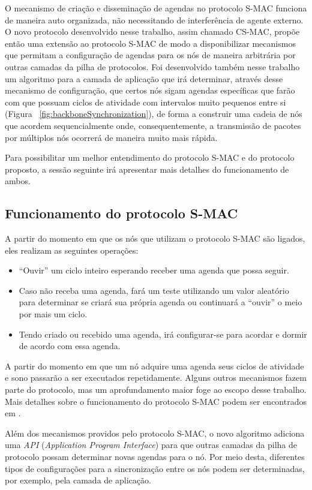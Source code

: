 O mecanismo de criação e disseminação de agendas no protocolo S-MAC funciona de maneira auto organizada, não necessitando de interferência de agente externo. O novo protocolo desenvolvido nesse trabalho, assim chamado CS-MAC, propõe então uma extensão ao protocolo S-MAC de modo a disponibilizar mecanismos que permitam a configuração de agendas para os nós de maneira arbitrária por outras camadas da pilha de protocolos. Foi desenvolvido também nesse trabalho um algoritmo para a camada de aplicação que irá determinar, através desse mecanismo de configuração,  que certos nós sigam agendas específicas que farão com que possuam ciclos de atividade com intervalos muito pequenos entre si (Figura ~\ref{fig:backboneSynchronization}), de forma a construir uma cadeia de nós que acordem sequencialmente onde, consequentemente, a transmissão de pacotes por múltiplos nós ocorrerá de maneira muito mais rápida.

Para possibilitar um melhor entendimento do protocolo S-MAC e do protocolo proposto, a sessão seguinte irá apresentar mais detalhes do funcionamento de ambos.

\subsection{Funcionamento do protocolo S-MAC}

A partir do momento em que os nós que utilizam o protocolo S-MAC são ligados, eles realizam as seguintes operações:

\begin{itemize}
	\item ``Ouvir'' um ciclo inteiro esperando receber uma agenda que possa seguir.
	\item Caso não receba uma agenda, fará um teste utilizando um valor aleatório para determinar se criará sua própria agenda ou continuará a ``ouvir'' o meio por mais um ciclo.
	\item Tendo criado ou recebido uma agenda, irá configurar-se para acordar e dormir de acordo com essa agenda.
\end{itemize}

A partir do momento em que um nó adquire uma agenda seus ciclos de atividade e sono passarão a ser executados repetidamente. Alguns outros mecanismos fazem parte do protocolo, mas um aprofundamento maior foge ao escopo desse trabalho. Mais detalhes sobre o funcionamento do protocolo S-MAC podem ser encontrados em  \citeyear{ye04}. 

Além dos mecanismos providos pelo protocolo S-MAC, o novo algoritmo adiciona uma \emph{API} (\emph{Application Program Interface}) para que outras camadas da pilha de protocolo possam determinar novas agendas para o nó. Por meio desta, diferentes tipos de configurações para a sincronização entre os nós podem ser determinadas, por exemplo, pela camada de aplicação.

